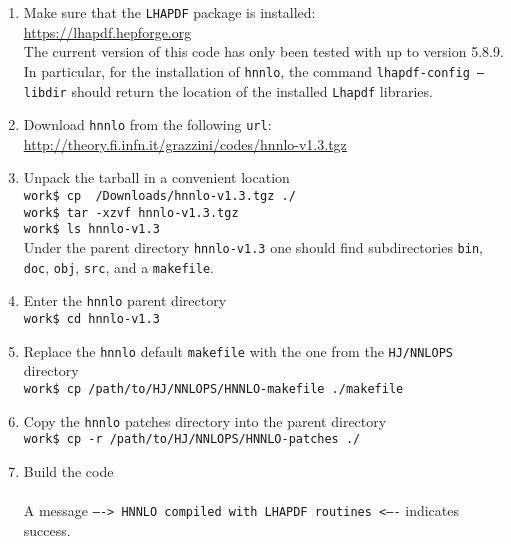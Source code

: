 \documentclass[11pt,a4paper]{article}
\newcommand{\noun}[1]{{\tt #1}}
\newcommand{\LHAPDF}{\noun{LHAPDF}}
\newcommand{\HNNLO}{\noun{hnnlo}}
\begin{document}
\begin{enumerate}
\item Make sure that the \LHAPDF{} package is installed:\\
\hspace*{5mm}
{\url{https://lhapdf.hepforge.org}}\\
The current version of this code has only been tested with up to
version 5.8.9. In particular, for the installation of \HNNLO{},
the command {\tt{lhapdf-config ---libdir}} should return the 
location of the installed {\noun{Lhapdf}} libraries.

\item Download \HNNLO{} from the following {\tt url}:\\
\hspace*{5mm}
{\url{http://theory.fi.infn.it/grazzini/codes/hnnlo-v1.3.tgz}}

\item Unpack the tarball in a convenient location\\
\hspace*{5mm}
{\tt{work\$ cp ~/Downloads/hnnlo-v1.3.tgz ./}}\\
\hspace*{5mm}
{\tt{work\$ tar -xzvf hnnlo-v1.3.tgz}}\\
\hspace*{5mm}
{\tt{work\$ ls hnnlo-v1.3}}\\
Under the parent directory {\tt{hnnlo-v1.3}} one should find subdirectories
{\tt{bin}}, {\tt{doc}}, {\tt{obj}}, {\tt{src}}, and a {\tt{makefile}}.

\item Enter the \HNNLO{} parent directory\\
\hspace*{5mm}
{\tt{work\$ cd hnnlo-v1.3}}

\item  Replace the \HNNLO{} default {\tt{makefile}} with the one
from the {\tt{HJ/NNLOPS}} directory\\
\hspace*{5mm}
{\tt{work\$ cp /path/to/HJ/NNLOPS/HNNLO-makefile ./makefile}}

\item  Copy the \HNNLO{} patches directory into the parent directory\\
\hspace*{5mm}
{\tt{work\$ cp -r /path/to/HJ/NNLOPS/HNNLO-patches ./}}

\item  Build the code\\
\\
A message {\tt{----> HNNLO compiled with LHAPDF routines <----}}
indicates success.


\end{enumerate}
\end{document}
